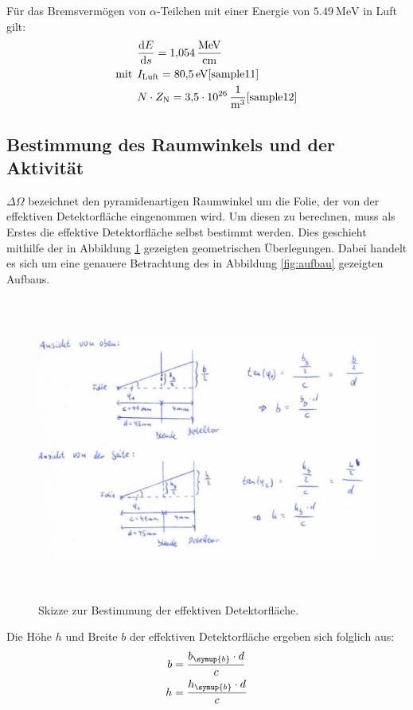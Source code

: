 Für das Bremsvermögen von $\alpha$-Teilchen mit einer Energie von $\SI{5.49}{\mega\eV}$ in Luft gilt:
\begin{align*}
  &\frac{\mathrm{d}E}{\mathrm{d}s} = \SI{1.054}{\mega\eV\per\centi\meter}\\
  \text{mit}\:\: &I_{\mathrm{Luft}} = \SI{80.5}{\eV} \text{\cite{sample11}}\\
  &N\cdot Z_{\mathrm{N}} = \SI{3.5e26}{\per\meter\tothe{3}} \text{\cite{sample12}}
\end{align*}
\subsection{Bestimmung des Raumwinkels und der Aktivität}

$\Delta \Omega$ bezeichnet den pyramidenartigen Raumwinkel um die Folie, der von
der effektiven Detektorfläche eingenommen wird. Um diesen zu berechnen, muss
als Erstes die effektive Detektorfläche selbst bestimmt werden. Dies geschieht
mithilfe der in Abbildung \ref{fig:skizze} gezeigten geometrischen Überlegungen.
Dabei handelt es sich um eine genauere Betrachtung des in Abbildung \ref{fig:aufbau}
gezeigten Aufbaus.

\begin{figure}[H]
  \centering
  \includegraphics[height=10cm]{Skizze.PNG}
  \caption{Skizze zur Bestimmung der effektiven Detektorfläche.}
  \label{fig:skizze}
\end{figure}

Die Höhe $h$ und Breite $b$ der effektiven Detektorfläche ergeben sich folglich
aus:
\begin{align*}
  b &= \frac{b_\symup{b} \cdot d}{c} \\
  h &= \frac{h_\symup{b} \cdot d}{c}
\end{align*}

